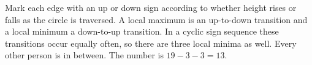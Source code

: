 Mark each edge with an up or down sign according to whether height rises or falls as the circle is traversed. A local maximum is an up-to-down transition and a local minimum a down-to-up transition. In a cyclic sign sequence these transitions occur equally often, so there are three local minima as well. Every other person is in between. The number is $19-3-3=\boxed{13}$.
